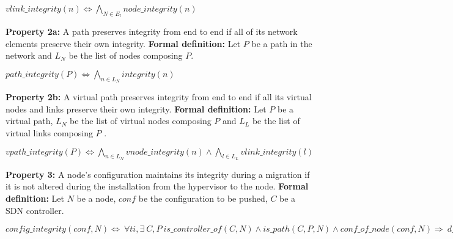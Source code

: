 \begin{myformula}
$vlink\_integrity(n) \Leftrightarrow \bigwedge\limits_{N \in E_l} node\_integrity(n)$
\end{myformula}


\textbf{Property 2a:} A path preserves integrity from end to end if all of its network elements preserve their own integrity.
\newline \textbf{Formal definition:} Let $P$ be a path in the network and $L_N$ be the list of nodes composing $P$.
\newline

\begin{myformula}
$path\_integrity(P) \Leftrightarrow \bigwedge\limits_{n \in L_N}integrity(n) $
\end{myformula}

\textbf{Property 2b:} A virtual path preserves integrity from end to end if all its virtual nodes and links preserve their own integrity.
\newline \textbf{Formal definition:} Let $P$ be a virtual path, $L_N$ be the list of virtual nodes composing $P$ and $L_L$ be the list of virtual links composing $P$ .
\newline

\begin{myformula}
$vpath\_integrity(P) \Leftrightarrow \bigwedge\limits_{n \in L_N}vnode\_integrity(n) \wedge \bigwedge\limits_{l \in L_L}vlink\_integrity(l) $
\end{myformula}

\textbf{Property 3:} A node's configuration maintains its integrity during a migration if it is not altered during the installation from the hypervisor to the node.
\newline \textbf{Formal definition:} Let $N$ be a node, $conf$ be the configuration to be pushed, $C$ be a SDN controller.
\newline

\begin{myformula}
$config\_integrity(conf,N) \Leftrightarrow~\forall ti,\exists~C,P 
~is\_controller\_of(C,N) \wedge is\_path(C,P,N) \wedge  conf\_of\_node(conf,N) \Rightarrow
~d\_integrity(conf,ti)
$
\end{myformula}


